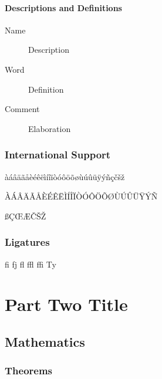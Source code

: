\documentclass[
	11pt,
	fleqn,
	a4paper,
]{LegrandOrangeBook}
\begin{document}
\subsection{Descriptions and Definitions}

\begin{description}
    \item[Name] Description
    \item[Word] Definition
    \item[Comment] Elaboration
\end{description}


\section{International Support}

àáâäãåèéêëìíîïòóôöõøùúûüÿýñçčšž

\noindent ÀÁÂÄÃÅÈÉÊËÌÍÎÏÒÓÔÖÕØÙÚÛÜŸÝÑ

\noindent ßÇŒÆČŠŽ


\section{Ligatures}

fi fj fl ffl ffi Ty


\part{Part Two Title}


\chapter{Mathematics}

\section{Theorems}
\end{document}
